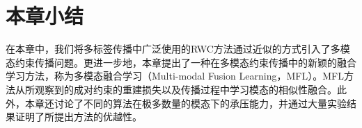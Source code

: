 \section{本章小结}
在本章中，我们将多标签传播中广泛使用的RWC方法通过近似的方式引入了多模态约束传播问题。更进一步地，本章提出了一种在多模态约束传播中的新颖的融合学习方法，称为多模态融合学习（Multi-modal Fusion Learning，MFL）。MFL方法从所观察到的成对约束的重建损失以及传播过程中学习模态的相似性融合。此外，本章还讨论了不同的算法在极多数量的模态下的承压能力，并通过大量实验结果证明了所提出方法的优越性。